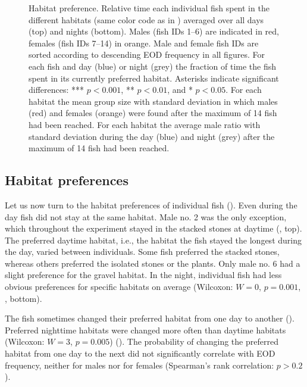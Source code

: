 \begin{figure*}[t!]
  \caption{\label{habitatpref} Habitat preference.
     Relative time each individual fish spent in the
    different habitats (same color code as in
    ) averaged over all days (top) and nights
    (bottom). Males (fish IDs 1--6) are indicated in red, females
    (fish IDs 7--14) in orange. Male and female fish IDs are sorted
    according to descending EOD frequency in all figures.
     For each fish and day (blue) or night (grey) the
    fraction of time the fish spent in its currently preferred
    habitat. Asterisks indicate significant differences: ***
    $p<0.001$, ** $p<0.01$, and * $p<0.05$.   For each
    habitat the mean group size with standard deviation in which males
    (red) and females (orange) were found after the maximum of 14 fish
    had been reached.   For each habitat the average male
    ratio with standard deviation during the day (blue) and night
    (grey) after the maximum of 14 fish had been reached. }
\end{figure*}

\subsection{Habitat preferences}
Let us now turn to the habitat preferences of individual fish (). Even during the day fish did not stay at the same habitat. Male no. 2 was the only exception, which throughout the experiment stayed in the stacked stones at daytime (, top). The preferred daytime habitat, i.e., the habitat the fish stayed the longest during the day, varied between individuals. Some fish preferred the stacked stones, whereas others preferred the isolated stones or the plants. Only male no. 6 had a slight preference for the gravel habitat. In the night, individual fish had less obvious preferences for specific habitats on average (Wilcoxon: $W=0$, $p=0.001$, , bottom).

The fish sometimes changed their preferred habitat from one day to another (). Preferred nighttime habitats were changed more often than daytime habitats (Wilcoxon: $W=3$, $p=0.005$) (). The probability of changing the preferred habitat from one day to the next did not significantly correlate with EOD frequency, neither for males nor for females (Spearman's rank correlation: $p>0.2$).

